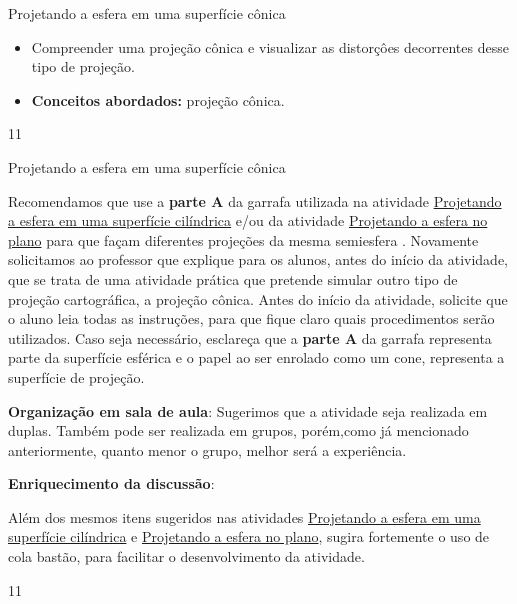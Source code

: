 \cleardoublepage
\def\currentcolor{session1}
\begin{objectives}{Projetando a esfera em uma superfície cônica}
{ \begin{itemize}
  \item Compreender uma projeção cônica e visualizar as distorçôes decorrentes desse tipo de projeção.
  \item \textbf{Conceitos abordados:} projeção cônica.
  \end{itemize}
}{1}{1}
\end{objectives}
\begin{sugestions}{Projetando a esfera em uma superfície cônica}
{
  Recomendamos que use a \textbf{parte A} da garrafa utilizada na  atividade \hyperref[proj_cil]{Projetando a esfera em uma superfície cilíndrica}   e/ou da atividade  \hyperref[proj-planas]{Projetando a esfera no plano} para que façam diferentes projeções da mesma semiesfera . Novamente solicitamos ao professor que  explique para os alunos, antes do início da atividade, que se trata de uma atividade prática que pretende simular outro tipo de projeção cartográfica, a projeção cônica.  Antes do início da atividade, solicite que o aluno leia todas as instruções, para que fique claro quais procedimentos serão utilizados. Caso seja necessário, esclareça que a \textbf{parte A} da garrafa representa parte da superfície esférica e o papel ao ser enrolado como um cone, representa a superfície de projeção.

  \textbf{Organização em sala de aula}: Sugerimos que a atividade seja realizada em duplas. Também pode ser realizada em grupos, porém,como já mencionado anteriormente, quanto menor o grupo, melhor será a experiência.

  \textbf{Enriquecimento da discussão}:
  
 Além dos mesmos itens sugeridos nas atividades \hyperref[proj_cil]{Projetando a esfera em uma superfície cilíndrica}   e \hyperref[proj-planas]{Projetando a esfera no plano}, sugira fortemente o uso de cola bastão, para facilitar o desenvolvimento da atividade.
}{1}{1}
\end{sugestions}
\clearmargin

